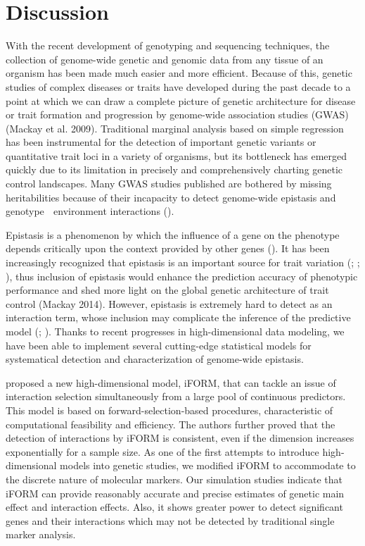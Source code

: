 \documentclass[]{book}
\theoremstyle{definition}
\theoremstyle{definition}
\theoremstyle{remark}
\begin{document}
\section{Discussion}\label{discussion}

With the recent development of genotyping and sequencing techniques, the
collection of genome-wide genetic and genomic data from any tissue of an
organism has been made much easier and more efficient. Because of this,
genetic studies of complex diseases or traits have developed during the
past decade to a point at which we can draw a complete picture of
genetic architecture for disease or trait formation and progression by
genome-wide association studies (GWAS) (Mackay et al. 2009). Traditional
marginal analysis based on simple regression has been instrumental for
the detection of important genetic variants or quantitative trait loci
in a variety of organisms, but its bottleneck has emerged quickly due to
its limitation in precisely and comprehensively charting genetic control
landscapes. Many GWAS studies published are bothered by missing
heritabilities because of their incapacity to detect genome-wide
epistasis and genotype  environment interactions
(\cite{manolio2009finding}).

Epistasis is a phenomenon by which the influence of a gene on the
phenotype depends critically upon the context provided by other genes
(\cite{cheverud1995epistasis}). It has been increasingly recognized that
epistasis is an important source for trait variation
(\cite{moore2003ubiquitous}; \cite{carlborg2004epistasis};
\cite{cordell2009detecting}), thus inclusion of epistasis would enhance
the prediction accuracy of phenotypic performance and shed more light on
the global genetic architecture of trait control (Mackay 2014). However,
epistasis is extremely hard to detect as an interaction term, whose
inclusion may complicate the inference of the predictive model
(\cite{carlborg2004epistasis}; \cite{mackay2014epistasis}). Thanks to
recent progresses in high-dimensional data modeling, we have been able
to implement several cutting-edge statistical models for systematical
detection and characterization of genome-wide epistasis.

\cite{hao2014interaction} proposed a new high-dimensional model, iFORM,
that can tackle an issue of interaction selection simultaneously from a
large pool of continuous predictors. This model is based on
forward-selection-based procedures, characteristic of computational
feasibility and efficiency. The authors further proved that the
detection of interactions by iFORM is consistent, even if the dimension
increases exponentially for a sample size. As one of the first attempts
to introduce high-dimensional models into genetic studies, we modified
iFORM to accommodate to the discrete nature of molecular markers. Our
simulation studies indicate that iFORM can provide reasonably accurate
and precise estimates of genetic main effect and interaction effects.
Also, it shows greater power to detect significant genes and their
interactions which may not be detected by traditional single marker
analysis.
\end{document}
